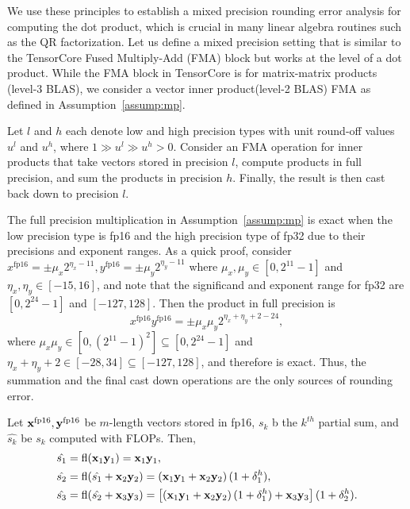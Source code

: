 We use these principles to establish a mixed precision rounding error analysis for computing the dot product, which is crucial in many linear algebra routines such as the QR factorization.
Let us define a mixed precision setting that is similar to the TensorCore Fused Multiply-Add (FMA) block but works at the level of a dot product. 
While the FMA block in TensorCore is for matrix-matrix products (level-3 BLAS), we consider a vector inner product(level-2 BLAS) FMA as defined in Assumption~\ref{assump:mp}.
\begin{assump}
	\label{assump:mp}
	Let $l$ and $h$ each denote low and high precision types with unit round-off values $u^l$ and $u^h$, where $1 \gg u^l \gg u^h >0$.
	Consider an FMA operation for inner products that take vectors stored in precision $l$, compute products in full precision, and sum the products in precision $h$. 
	Finally, the result is then cast back down to precision $l$.
\end{assump}
The full precision multiplication in Assumption~\ref{assump:mp} is exact when the low precision type is fp16 and the high precision type of fp32 due to their precisions and exponent ranges. 
As a quick proof, consider $x^{\text{fp16}} = \pm\mu_x2^{\eta_x -11},y^{\text{fp16}} = \pm\mu_y2^{\eta_y -11}$ where $\mu_x,\mu_y\in[0,2^{11}-1]$ and $\eta_x,\eta_y\in[-15,16]$, and note that the significand and exponent range for fp32 are $[0, 2^{24}-1]$ and $[-127,128]$.
Then the product in full precision is
$$
x^{\text{fp16}}y^{\text{fp16}} = \pm\mu_x\mu_y 2^{\eta_x+\eta_y+2-24},
$$
where  $\mu_x\mu_y \in[0,(2^{11}-1)^2] \subseteq [0,2^{24}-1]$ and $\eta_x+\eta_y +2\in[-28,34]\subseteq[-127,128]$, and therefore is exact.
Thus, the summation and the final cast down operations are the only sources of rounding error.\par
Let $\mathbf{x}^{\text{fp16}},\mathbf{y}^{\text{fp16}}$ be $m$-length vectors stored in fp16, $s_k$ b the $k^{th}$ partial sum, and $\hat{s_k}$ be $s_k$ computed with FLOPs.
Then,
\begin{align*}
\hat{s_1} &= \mathrm{fl} (\mathbf{x}_1\mathbf{y}_1) = \mathbf{x}_1\mathbf{y}_1,\\
\hat{s_2} &= \mathrm{fl}(\hat{s_1} + \mathbf{x}_2\mathbf{y}_2) = \left(\mathbf{x}_1\mathbf{y}_1+ \mathbf{x}_2\mathbf{y}_2\right)(1+\delta_{1}^h),\\
\hat{s_3} &= \mathrm{fl}(\hat{s_2}+\mathbf{x}_3\mathbf{y}_3) = \left[\left(\mathbf{x}_1\mathbf{y}_1 + \mathbf{x}_2\mathbf{y}_2\right)(1+\delta_{1}^h)  + \mathbf{x}_3\mathbf{y}_3\right](1+\delta_{2}^h).
\end{align*}
